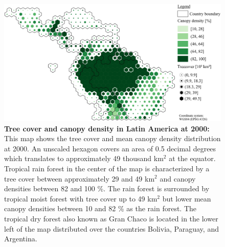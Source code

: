			\begin{figure}[ht]
				\centering
				\includegraphics[scale=.98]{img/americas_treecover_frameless}
				\caption[Tree cover and canopy density in Latin America at 2000]{\textbf{Tree cover and canopy density in Latin America at 2000:} This map shows the tree cover and mean canopy density distribution at 2000. An unscaled hexagon covers an area of 0.5 decimal degrees which translates to approximately 49 thousand km$^2$ at the equator. Tropical rain forest in the center of the map is characterized by a tree cover between approximately 29 and 49 km$^2$ and canopy densities between 82 and 100 \%. The rain forest is surrounded by tropical moist forest with tree cover up to 49 km$^2$ but lower mean canopy densities between 10 and 82 \% as the rain forest. The tropical dry forest also known as Gran Chaco is located in the lower left of the map distributed over the countries Bolivia, Paraguay, and Argentina.}
				\label{fig:americas_tree_cover}
			\end{figure}

